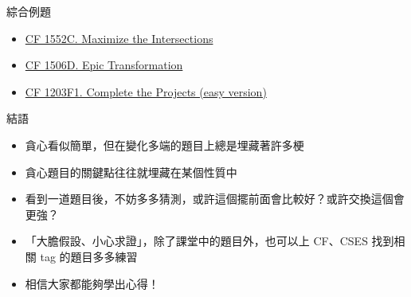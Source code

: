 \documentclass[aspectratio=169]{beamer}
\begin{document}
    \begin{frame}{綜合例題}
        \begin{itemize}
            \item \href{https://codeforces.com/contest/1552/problem/C}{CF 1552C. Maximize the Intersections}
            \item \href{C. Maximize the Intersections}{CF 1506D. Epic Transformation}
            \item \href{https://codeforces.com/problemset/problem/1203/F1}{CF 1203F1. Complete the Projects (easy version)}
        \end{itemize}
    \end{frame}

    \begin{frame}{結語}
        \begin{itemize}
            \item<1-> 貪心看似簡單，但在變化多端的題目上總是埋藏著許多梗
            \item<2-> 貪心題目的關鍵點往往就埋藏在某個性質中
            \item<3-> 看到一道題目後，不妨多多猜測，或許這個擺前面會比較好？或許交換這個會更強？
            \item<4-> 「大膽假設、小心求證」，除了課堂中的題目外，也可以上 CF、CSES 找到相關 tag 的題目多多練習
            \item<5-> 相信大家都能夠學出心得！
        \end{itemize}
    \end{frame}
\end{document}
